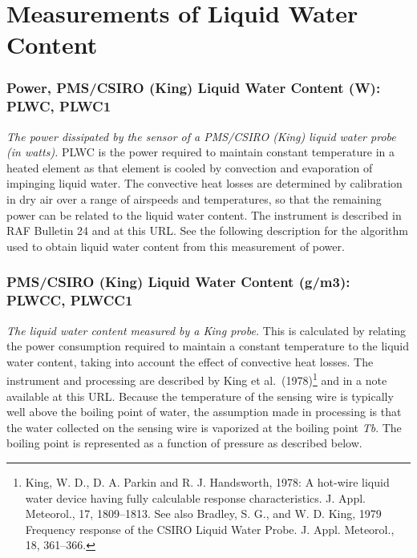 \documentclass[
  english,
]{book}
\begin{document}
\hypertarget{LWC}{%
\section{Measurements of Liquid Water Content}\label{LWC}}

\hypertarget{plwc}{%
\subsubsection*{Power, PMS/CSIRO (King) Liquid Water Content (W): PLWC,
PLWC1}\label{plwc}}

\emph{The power dissipated by the sensor of a PMS/CSIRO (King) liquid
water probe (in watts).} PLWC is the power required to maintain constant
temperature in a heated element as that element is cooled by convection
and evaporation of impinging liquid water. The convective heat losses
are determined by calibration in dry air over a range of airspeeds and
temperatures, so that the remaining power can be related to the liquid
water content. The instrument is described in RAF Bulletin 24 and at
this URL. See the following description for the algorithm used to obtain
liquid water content from this measurement of power.

\hypertarget{plwcc}{%
\subsubsection*{\texorpdfstring{PMS/CSIRO (King) Liquid Water Content
(g/m{3}): PLWCC,
PLWCC1}{PMS/CSIRO (King) Liquid Water Content (g/m3): PLWCC, PLWCC1}}\label{plwcc}}

\emph{The liquid water content} \emph{measured by a King probe.} This is
calculated by relating the power consumption required to maintain a
constant temperature to the liquid water content, taking into account
the effect of convective heat losses. The instrument and processing are
described by King et al.~(1978)\footnote{King, W. D., D. A. Parkin and
  R. J. Handsworth, 1978: A hot-wire liquid water device having fully
  calculable response characteristics. J. Appl. Meteorol., 17,
  1809--1813. See also Bradley, S. G., and W. D. King, 1979 Frequency
  response of the CSIRO Liquid Water Probe. J. Appl. Meteorol., 18,
  361--366.} and in a note available at this URL. Because the
temperature of the sensing wire is typically well above the boiling
point of water, the assumption made in processing is that the water
collected on the sensing wire is vaporized at the boiling point
{\emph{T}\emph{b}}. The boiling point is represented as a function of
pressure as described below.
\end{document}
